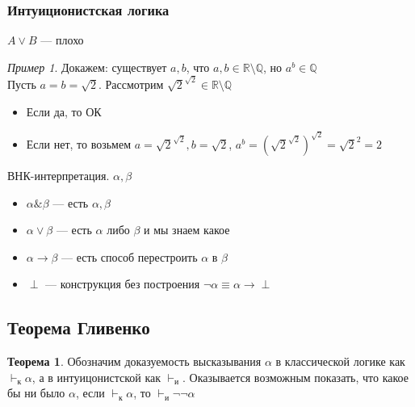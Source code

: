 \documentclass[english]{article}
\newcommand{\R}{\mathbb{R}}
\theoremstyle{plain}
\theoremstyle{remark}
\newtheorem*{examp}{Пример}
\theoremstyle{definition}
\newtheorem{theorem}{Теорема}[section]
\begin{document}
\subsubsection{Интуиционистская логика}
\label{sec:org2d8cd24}
\(A \vee B\) --- плохо
\begin{examp}
Докажем: существует \(a, b\), что \(a, b \in \R \setminus \mathbb{Q}\), но \(a^b \in \mathbb{Q}\) \\
Пусть \(a = b = \sqrt{2}\). Рассмотрим \(\sqrt{2}^{\sqrt{2}} \in \R \setminus \mathbb{Q}\)
\begin{itemize}
\item Если да, то ОК
\item Если нет, то возьмем \(a = \sqrt{2}^{\sqrt{2}}, b = \sqrt{2}\), \(a^b = (\sqrt{2}^{\sqrt{2}})^{\sqrt{2}} = \sqrt{2}^{2} = 2\)
\end{itemize}
\end{examp}
\begin{defintion}
ВНК-интерпретация. \(\alpha, \beta\)
\begin{itemize}
\item \(\alpha \& \beta\) --- есть \(\alpha, \beta\)
\item \(\alpha \vee \beta\) --- есть \(\alpha\) либо \(\beta\) и мы знаем какое
\item \(\alpha \to \beta\) --- есть способ перестроить \(\alpha\) в \(\beta\)
\item \(\perp\) --- конструкция без построения \(\neg \alpha \equiv \alpha \to \perp\)
\end{itemize}
\end{defintion}
\subsection{Теорема Гливенко}
\label{sec:orgd00b656}
\begin{theorem}
Обозначим доказуемость высказывания \(\alpha\) в классической логике как \(\vdash_{\text{к}} \alpha\), а в интуицонистской как \(\vdash_{\text{и}}\). Оказывается возможным показать, что какое бы ни было \(\alpha\), если \(\vdash_{\text{к}} \alpha\), то \(\vdash_{\text{и}} \neg\neg \alpha\)
\end{theorem}
\end{document}
